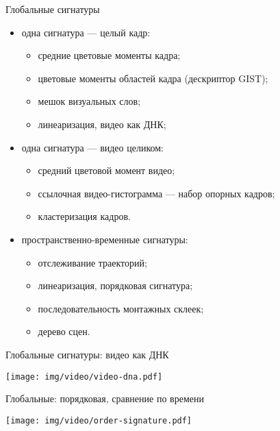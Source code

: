 


\begin{frame}{Глобальные сигнатуры}

    \begin{itemize}
        \item одна сигнатура — целый кадр:
        \begin{itemize}
            \item  средние цветовые моменты кадра;
            \item  цветовые моменты областей кадра (дескриптор GIST);
            \item  мешок визуальных слов;
            \item  линеаризация, видео как ДНК;
        \end{itemize}
        \item одна сигнатура — видео целиком:
        \begin{itemize}
            \item   средний цветовой момент видео;
            \item   ссылочная видео-гистограмма — набор опорных кадров;
            \item   кластеризация кадров.
        \end{itemize}
        \item пространственно-временные сигнатуры:
        \begin{itemize}
            \item   отслеживание траекторий;
            \item   линеаризация, порядковая сигнатура;
            \item   последовательность монтажных склеек;
            \item   дерево сцен.
        \end{itemize}
    \end{itemize}

\end{frame}

\begin{frame}{Глобальные сигнатуры: видео как ДНК}
    \begin{center}
        \texttt{[image: img/video/video-dna.pdf]}
    \end{center}
\end{frame}

\begin{frame}{Глобальные: порядковая, сравнение по времени}
    \begin{center}
        \texttt{[image: img/video/order-signature.pdf]}
    \end{center}
\end{frame}



